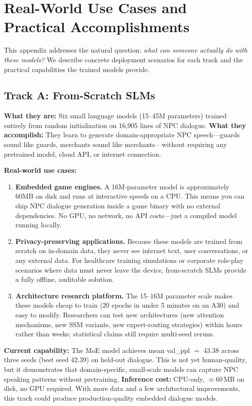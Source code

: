 \documentclass[11pt]{article}
\begin{document}
\section{Real-World Use Cases and Practical Accomplishments}
\label{app:usecases}

This appendix addresses the natural question: \textit{what can someone actually do with these models?}
We describe concrete deployment scenarios for each track and the practical capabilities the trained models provide.

\subsection{Track A: From-Scratch SLMs}

\textbf{What they are:} Six small language models (15--45M parameters) trained entirely from random initialization on 16,905 lines of NPC dialogue.
\textbf{What they accomplish:} They learn to generate domain-appropriate NPC speech---guards sound like guards, merchants sound like merchants---without requiring any pretrained model, cloud API, or internet connection.

\textbf{Real-world use cases:}
\begin{enumerate}
    \item \textbf{Embedded game engines.} A 16M-parameter model is approximately 60MB on disk and runs at interactive speeds on a CPU.
    This means you can ship NPC dialogue generation inside a game binary with no external dependencies.
    No GPU, no network, no API costs---just a compiled model running locally.
    \item \textbf{Privacy-preserving applications.} Because these models are trained from scratch on in-domain data, they never see internet text, user conversations, or any external data.
    For healthcare training simulations or corporate role-play scenarios where data must never leave the device, from-scratch SLMs provide a fully offline, auditable solution.
    \item \textbf{Architecture research platform.} The 15--16M parameter scale makes these models cheap to train (20 epochs in under 5 minutes on an A30) and easy to modify.
    Researchers can test new architectures (new attention mechanisms, new SSM variants, new expert-routing strategies) within hours rather than weeks; statistical claims still require multi-seed reruns.
\end{enumerate}

\textbf{Current capability:} The MoE model achieves mean val\_ppl $=$ 43.38 across three seeds (best seed 42.39) on held-out dialogue.
This is not yet human-quality, but it demonstrates that domain-specific, small-scale models can capture NPC speaking patterns without pretraining.
\textbf{Inference cost:} CPU-only, $\approx$60\,MB on disk, no GPU required.
With more data and a few architectural improvements, this track could produce production-quality embedded dialogue models.
\end{document}
